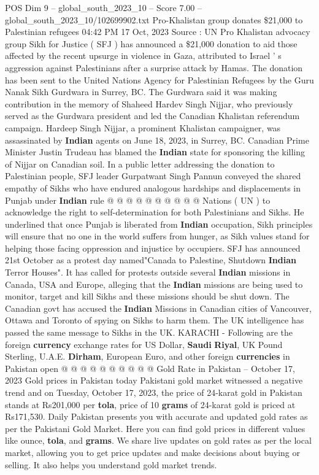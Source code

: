 \begin{textsample}{POS Dim 9 – global\_south\_2023\_10 – Score 7.00 – global\_south\_2023\_10/102699902.txt}  \label{ex:f9_pos_075}
Pro-Khalistan group donates \$21,000 to Palestinian refugees 04:42 PM 17 Oct, 2023 Source : UN Pro Khalistan advocacy group Sikh for Justice ( SFJ ) has announced a \$21,000 donation to aid those affected by the recent upsurge in violence in Gaza, attributed to Israel ' s aggression against Palestinians after a surprise attack by Hamas.
The donation has been sent to the United Nations Agency for Palestinian Refugees by the Guru Nanak Sikh Gurdwara in Surrey, BC.
The Gurdwara said it was making contribution in the memory of Shaheed Hardev Singh Nijjar, who previously served as the Gurdwara president and led the Canadian Khalistan referendum campaign.
Hardeep Singh Nijjar, a prominent Khalistan campaigner, was assassinated by \textbf{Indian} agents on June 18, 2023, in Surrey, BC.
Canadian Prime Minister Justin Trudeau has blamed the \textbf{Indian} state for sponsoring the killing of Nijjar on Canadian soil.
In a public letter addressing the donation to Palestinian people, SFJ leader Gurpatwant Singh Pannun conveyed the shared empathy of Sikhs who have endured analogous hardships and displacements in Punjab under \textbf{Indian} rule @ @ @ @ @ @ @ @ @ @ Nations ( UN ) to acknowledge the right to self-determination for both Palestinians and Sikhs.
He underlined that once Punjab is liberated from \textbf{Indian} occupation, Sikh principles will ensure that no one in the world suffers from hunger, as Sikh values stand for helping those facing oppression and injustice by occupiers.
SFJ has announced 21st October as a protest day named"Canada to Palestine, Shutdown \textbf{Indian} Terror Houses".
It has called for protests outside several \textbf{Indian} missions in Canada, USA and Europe, alleging that the \textbf{Indian} missions are being used to monitor, target and kill Sikhs and these missions should be shut down.
The Canadian govt has accused the \textbf{Indian} Missions in Canadian cities of Vancouver, Ottawa and Toronto of spying on Sikhs to harm them.
The UK intelligence has passed the same message to Sikhs in the UK.
KARACHI - Following are the foreign \textbf{currency} exchange rates for US Dollar, \textbf{Saudi} \textbf{Riyal}, UK Pound Sterling, U.A.E. \textbf{Dirham}, European Euro, and other foreign \textbf{currencies} in Pakistan open @ @ @ @ @ @ @ @ @ @ Gold Rate in Pakistan -- October 17, 2023 Gold prices in Pakistan today Pakistani gold market witnessed a negative trend and on Tuesday, October 17, 2023, the price of 24-karat gold in Pakistan stands at Rs201,000 per \textbf{tola}, price of 10 \textbf{grams} of 24-karat gold is priced at Rs171,530.
Daily Pakistan presents you with accurate and updated gold rates as per the Pakistani Gold Market.
Here you can find gold prices in different values like ounce, \textbf{tola}, and \textbf{grams}.
We share live updates on gold rates as per the local market, allowing you to get price updates and make decisions about buying or selling.
It also helps you understand gold market trends.

\end{textsample}
